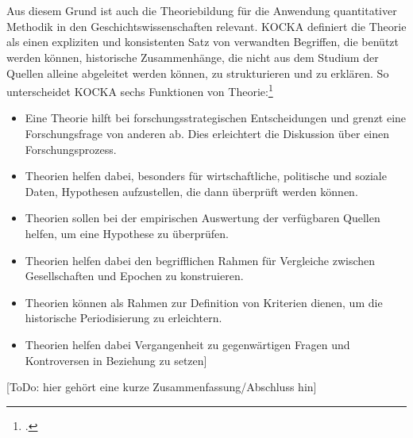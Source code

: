 \documentclass[12pt,a4paper]{article}
\begin{document}
\\
\\
Aus diesem Grund ist auch die Theoriebildung für die Anwendung quantitativer Methodik in den Geschichtswissenschaften relevant. KOCKA definiert die Theorie als einen expliziten und konsistenten Satz von verwandten Begriffen, die benützt werden können, historische Zusammenhänge, die nicht aus dem Studium der Quellen alleine abgeleitet werden können, zu strukturieren und zu erklären. So unterscheidet KOCKA  sechs Funktionen von Theorie:\footcite[][S.10-14]{schroder1988historische}  
\begin{itemize}
\item Eine Theorie hilft bei forschungsstrategischen Entscheidungen und grenzt eine Forschungsfrage von anderen ab. Dies erleichtert die Diskussion über einen Forschungsprozess.
\item Theorien helfen dabei, besonders für wirtschaftliche, politische und soziale Daten, Hypothesen aufzustellen, die dann überprüft werden können.
\item Theorien sollen bei der empirischen Auswertung der verfügbaren Quellen helfen, um eine Hypothese zu überprüfen.
\item Theorien helfen dabei den begrifflichen Rahmen für Vergleiche zwischen Gesellschaften und Epochen zu konstruieren.
\item Theorien können als Rahmen zur Definition von Kriterien dienen, um die historische Periodisierung zu erleichtern.
\item  Theorien helfen dabei Vergangenheit zu gegenwärtigen Fragen und Kontroversen in Beziehung zu setzen]
\end{itemize}

[ToDo: hier gehört eine kurze Zusammenfassung/Abschluss hin]


\newpage
\end{document}

